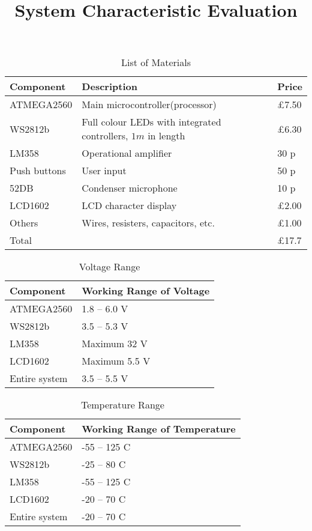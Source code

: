 \documentclass[12pt]{article}
\title{System Characteristic Evaluation}
\begin{document}
\begin{table}[H!]\centering
  \caption{List of Materials}
  \begin{tabular}{l|l|l}
    \hline
    Component & Description & Price \\
    \hline
    ATMEGA2560 & Main microcontroller(processor) & \pounds 7.50 \\
    WS2812b & Full colour LEDs with integrated controllers, $1m$ in length & \pounds 6.30 \\
    LM358 & Operational amplifier & 30 p \\
    Push buttons & User input & 50 p \\
    52DB & Condenser microphone & 10 p \\
    LCD1602 & LCD character display & \pounds 2.00 \\
    Others & Wires, resisters, capacitors, etc. & \pounds 1.00 \\
    \hline
    Total & & \pounds 17.7 \\
    \hline
  \end{tabular}
\end{table}

\begin{table}[H!]\centering
  \caption{Voltage Range}
  \begin{tabular}{l|l}
    \hline
    Component & Working Range of Voltage \\
    \hline
    ATMEGA2560 & 1.8 -- 6.0 V \\
    WS2812b & 3.5 -- 5.3 V \\
    LM358 & Maximum 32 V \\
    LCD1602 & Maximum 5.5 V \\
    \hline
    Entire system & 3.5 -- 5.5 V \\
    \hline
  \end{tabular}
\end{table}

\begin{table}[H!]\centering
  \caption{Temperature Range}
  \begin{tabular}{l|l}
    \hline
    Component & Working Range of Temperature \\
    \hline
    ATMEGA2560 & -55 -- 125 \textdegree{}C \\
    WS2812b & -25 -- 80 \textdegree{}C \\
    LM358 & -55 -- 125 \textdegree{}C \\
    LCD1602 & -20 -- 70 \textdegree{}C \\
    \hline
    Entire system & -20 -- 70 \textdegree{}C \\
    \hline
  \end{tabular}
\end{table}
\end{document}
